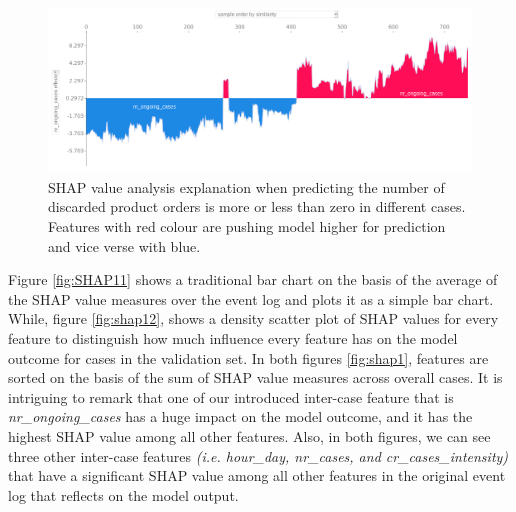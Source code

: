 \begin{figure}[!htbp]
	\includegraphics[width=\linewidth]{images/shap/allsamples_ongoing.png}
	\caption[SHAP force plot product (true outcome)]{SHAP value analysis explanation when predicting the number of discarded product orders is more or less than zero in different cases. Features with red colour are pushing model higher for prediction and vice verse with blue.}
	\label{fig:afp}
\end{figure}\hspace*{\fill}



Figure \ref{fig:SHAP11} shows a traditional bar chart on the basis of the average of the SHAP value measures over the event log and plots it as a simple bar chart. While, figure \ref{fig:shap12}, shows a density scatter plot of SHAP values for every feature to distinguish how much influence every feature has on the model outcome for cases in the validation set. In both figures \ref{fig:shap1}, features are sorted on the basis of the sum of SHAP value measures across overall cases. It is intriguing to remark that one of our introduced inter-case feature that is  \textit{nr\_ongoing\_cases} has a huge impact on the model outcome, and it has the highest SHAP value among all other features. Also, in both figures, we can see three other inter-case features \textit{(i.e. hour\_day, nr\_cases, and cr\_cases\_intensity)} that have a significant SHAP value among all other features in the original event log that reflects on the model output. 


